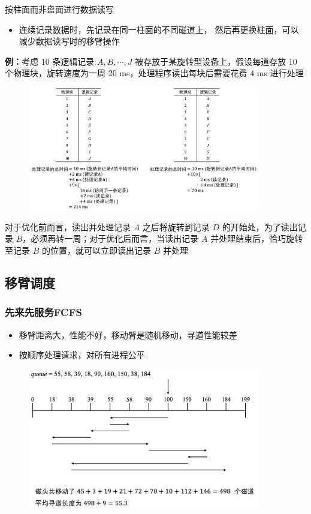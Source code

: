 \documentclass[cs4size,a4paper,10pt]{ctexart}
\begin{document}
	按柱面而非盘面进行数据读写
	\begin{itemize}
		\item 连续记录数据时，先记录在同一柱面的不同磁道上， 然后再更换柱面，可以减少数据读写时的移臂操作
	\end{itemize}

	\textbf{例：}考虑 10 条逻辑记录 $A, B, \cdots, J$ 被存放于某旋转型设备上，假设每道存放 10 个物理块，旋转速度为一周 20 ms，处理程序读出每块后需要花费 4 ms 进行处理
	\begin{figure}[H]
		\centering
		\includegraphics[width=0.9\textwidth]{img/4.4.3.2}
	\end{figure}

	对于优化前而言，读出并处理记录 $A$ 之后将旋转到记录 $D$ 的开始处，为了读出记录 $B$，必须再转一周；对于优化后而言，当读出记录 $A$ 并处理结束后，恰巧旋转至记录 $B$ 的位置，就可以立即读出记录 $B$ 并处理

	\subsection{移臂调度}

	\subsubsection{先来先服务FCFS}
	\begin{itemize}
		\item 移臂距离大，性能不好，移动臂是随机移动，寻道性能较差
		\item 按顺序处理请求，对所有进程公平
	\end{itemize}
	\begin{figure}[H]
		\centering
		\includegraphics[width=0.9\textwidth]{img/FCFS disk}
	\end{figure}
\end{document}
